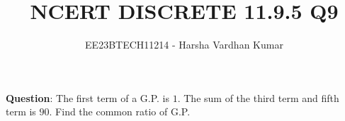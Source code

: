 \documentclass[journal,12pt,twocolumn]{IEEEtran}
\title{NCERT DISCRETE 11.9.5 Q9}
\author{EE23BTECH11214 - Harsha Vardhan Kumar}
\begin{document}
\maketitle
\textbf{Question}:
 The first term of a G.P. is $1$. The sum of the third term and fifth
term is $90$. Find the common ratio of G.P.
\end{document}
